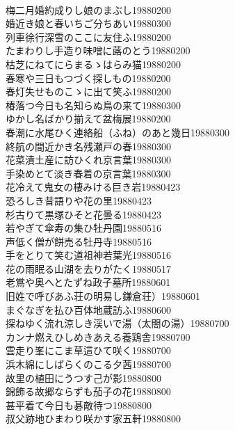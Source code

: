 \begin{multicols}{2}
\\梅二月婚約成りし娘のまぶし\hfill{19880200}
\\婚近き娘と春いちご分ちあい\hfill{19880300}
\\列車徐行深雪のここに友住ふ\hfill{19880200}
\\たまわりし手造り味噌に蕗のとう\hfill{19880200}
\\枯芝にねてにらまるゝはらみ猫\hfill{19880200}
\\春寒や三日もつづく探しもの\hfill{19880200}
\\春灯失せものこゝに出て笑ふ\hfill{19880200}
\\椿落つ今日も名知らぬ鳥の来て\hfill{19880300}
\\ゆかし名ばかり揃えて盆梅展\hfill{19880200}
\\春潮に水尾ひく連絡船（ふね）のあと幾日\hfill{19880300}
\\終航の間近かき名残瀬戸の春\hfill{19880300}
\\花菜漬土産に訪ひくれ京言葉\hfill{19880300}
\\手染めとて淡き春着の京言葉\hfill{19880300}
\\花冷えて鬼女の棲みける巨き岩\hfill{19880423}
\\恐ろしき昔語りや花の里\hfill{19880423}
\\杉古りて黒塚ひそと花曇る\hfill{19880423}
\\若やぎて傘寿の集ひ牡丹園\hfill{19880516}
\\声低く僧が餅売る牡丹寺\hfill{19880516}
\\手をとりて笑む道祖神若葉光\hfill{19880516}
\\花の雨眠る山湖を去りがたく\hfill{19880517}
\\老鴬や奥へとたずね政子墓所\hfill{19880601}
\\旧姓で呼びあふ荘の明易し鎌倉荘）\hfill{19880601}
\\まぐなぎを払ひ百体地蔵訪ふ\hfill{19880600}
\\探ねゆく流れ涼しき渓いで湯（太閤の湯）\hfill{19880700}
\\カンナ燃えひしめきあえる養鶏舎\hfill{19880700}
\\雲走り峯にこま草這ひて咲く\hfill{19880700}
\\浜木綿にしばらくのこる夕茜\hfill{19880700}
\\故里の植田にうつす己が影\hfill{19880800}
\\錦飾る故郷ならずも茄子の花\hfill{19880800}
\\甚平着て今日も碁敵待つ\hfill{19880800}
\\叔父跡地ひまわり咲かす家五軒\hfill{19880800}

\end{multicols}

